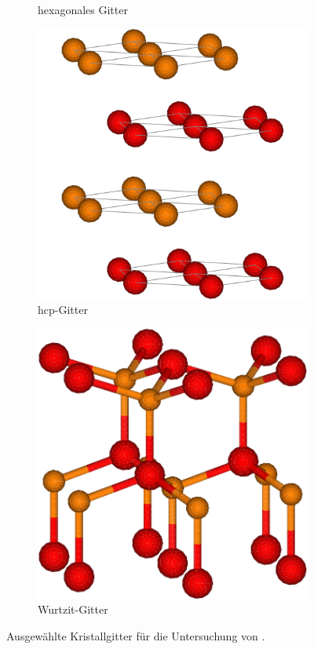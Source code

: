 \begin{figure}
\begin{subfigure}[t]{0.3\textwidth}
        \caption{hexagonales Gitter} \label{hex}
    \end{subfigure}
    \begin{subfigure}[t]{0.3\textwidth}
        \centering
        \includegraphics[width=\textwidth]{../assets/theorie/hcp}
        \caption{hcp-Gitter} \label{hcp}
    \end{subfigure}
    \begin{subfigure}[t]{0.3\textwidth}
        \centering
        \includegraphics[width=\textwidth]{../assets/theorie/wurzite}
        \caption{Wurtzit-Gitter} \label{wurtzit}
    \end{subfigure}
    \caption{Ausgewählte Kristallgitter für die Untersuchung von \heo.} \label{fig:gitterstrukturen}
\end{figure}

